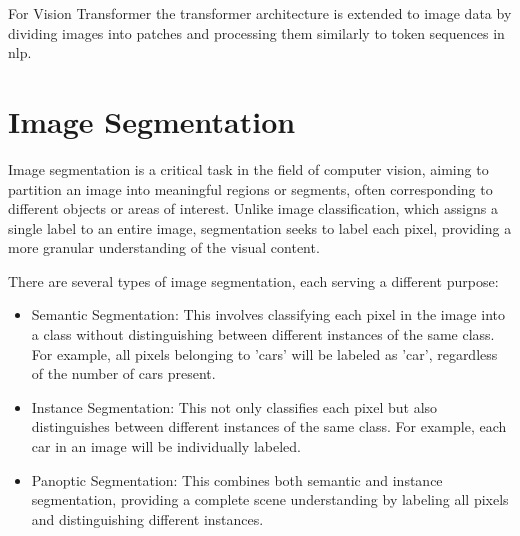 For Vision Transformer the transformer architecture is extended to image data by dividing images into patches and processing them similarly to token sequences in \gls{nlp}.


\section{Image Segmentation}
Image segmentation is a critical task in the field of computer vision, aiming to partition an image into meaningful regions or segments, often corresponding to different objects or areas of interest. Unlike image classification, which assigns a single label to an entire image, segmentation seeks to label each pixel, providing a more granular understanding of the visual content.

There are several types of image segmentation, each serving a different purpose:
\begin{itemize}
	\item Semantic Segmentation: This involves classifying each pixel in the image into a class without distinguishing between different instances of the same class. For example, all pixels belonging to 'cars' will be labeled as 'car', regardless of the number of cars present.
	\item Instance Segmentation: This not only classifies each pixel but also distinguishes between different instances of the same class. For example, each car in an image will be individually labeled.
	\item Panoptic Segmentation: This combines both semantic and instance segmentation, providing a complete scene understanding by labeling all pixels and distinguishing different instances.
\end{itemize}

